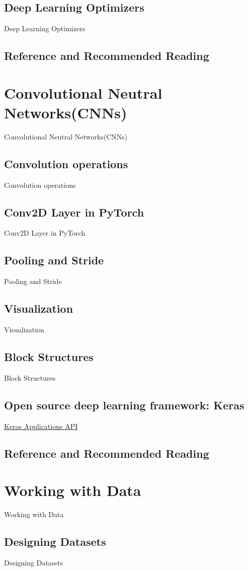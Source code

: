 \documentclass[a4paper,12pt]{article}
\begin{document}
\subsection{Deep Learning Optimizers}
Deep Learning Optimizers
\subsection{Reference and Recommended Reading}

\clearpage
\section{Convolutional Neutral Networks(CNNs)}
Convolutional Neutral Networks(CNNs)
\subsection{Convolution operations}
Convolution operations
\subsection{Conv2D Layer in PyTorch}
Conv2D Layer in PyTorch
\subsection{Pooling and Stride}
Pooling and Stride
\subsection{Visualization}
Visualization
\subsection{Block Structures}
Block Structures
\subsection{Open source deep learning framework: Keras}
\href{https://keras.io/api/applications/}{Keras Applications API}
\subsection{Reference and Recommended Reading}

\clearpage
\section{Working with Data}
Working with Data
\subsection{Designing Datasets}
Designing Datasets
\end{document}
